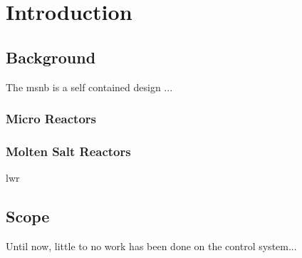 \chapter{Introduction}
\label{Chapter:Introduction}

\section{Background}
The \acf{msnb} is a self contained design \cite{CarterPHD,PetersonMS}... 

\subsection{Micro Reactors}

\subsection{Molten Salt Reactors}
\acf{lwr}


\section{Scope}
Until now, little to no work has been done on the control system... 